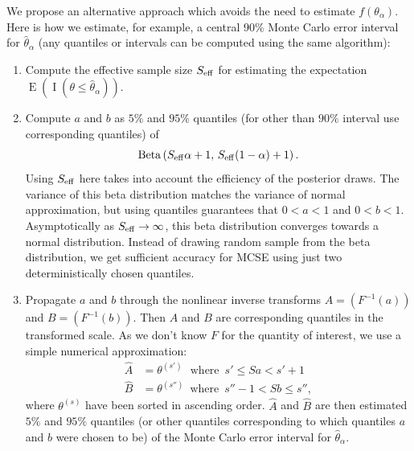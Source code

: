 \documentclass[american,]{article}
\DeclareMathOperator{\Beta}{Beta}
\DeclareMathOperator{\E}{E}
\DeclareMathOperator{\I}{I}
\theoremstyle{definition}
\begin{document}
We propose an alternative approach which avoids the need
to estimate \(f(\theta_\alpha)\). Here is how we estimate, for example,
a central 90\% Monte Carlo error interval for \(\hat{\theta}_\alpha\)
(any quantiles or intervals can be computed using the same algorithm):
\begin{enumerate}
\def\labelenumi{\arabic{enumi}.}
\item Compute the effective sample size \(S_{\rm eff}\) for estimating the expectation \(\E(\I(\theta \leq \hat{\theta}_\alpha))\).
\item Compute \(a\) and \(b\) as \(5\%\) and \(95\%\) quantiles (for other than \(90\%\) interval use corresponding quantiles) of
  \begin{equation}
  \Beta\left(S_{\rm eff} \alpha+1,\, S_{\rm eff} (1-\alpha) + 1\right).
\end{equation}
  Using $S_{\rm eff}$ here takes into account the efficiency of the
  posterior draws. The variance of this beta distribution matches the
  variance of normal approximation, but using quantiles guarantees
  that $0<a<1$ and $0<b<1$.  Asymptotically as
  \(S_{\rm eff} \rightarrow \infty \), this beta distribution
  converges towards a normal distribution. Instead of drawing random
  sample from the beta distribution, we get sufficient accuracy for
  MCSE using just two deterministically chosen quantiles.
\item Propagate $a$ and $b$ through the nonlinear inverse transforms
  $A=(F^{-1}(a))$ and $B=(F^{-1}(b))$. Then $A$ and $B$ are
  corresponding quantiles in the transformed scale.
  As we don't know $F$ for the quantity of interest, we use a simple numerical approximation:
  \begin{align*}
  \widehat{A} & = \theta^{(s')} \,\,\text{ where }\,  s' \leq Sa < s'+1 \\
  \widehat{B} & = \theta^{(s'')}  \,\text{ where }\,  s''-1 < Sb \leq s'',
  \end{align*}
  where $\theta^{(s)}$ have been sorted in ascending order.
  $\widehat{A}$ and $\widehat{B}$ are then estimated \(5\%\) and
  \(95\%\) quantiles (or other quantiles corresponding to which
  quantiles $a$ and $b$ were chosen to be) of the Monte Carlo error
  interval for \(\hat{\theta}_\alpha\).
\end{enumerate}
\end{document}
